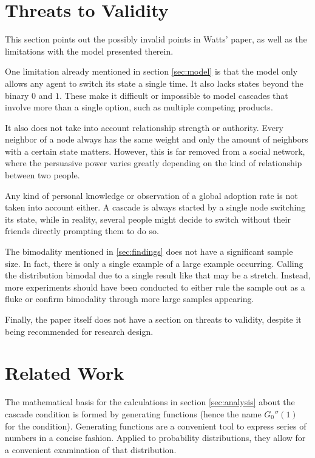 \documentclass{sig-alternate-05-2015}
\begin{document}
\section{Threats to Validity}\label{sec:threats}

This section points out the possibly invalid points in Watts' paper\cite{simplemodel}, as well as the limitations with the model presented therein.

One limitation already mentioned in section \ref{sec:model} is that the model only allows any agent to switch its state a single time. It also lacks states beyond the binary $0$ and $1$. These make it difficult or impossible to model cascades that involve more than a single option, such as multiple competing products.

It also does not take into account relationship strength or authority. Every neighbor of a node always has the same weight and only the amount of neighbors with a certain state matters. However, this is far removed from a social network, where the persuasive power varies greatly depending on the kind of relationship between two people.

Any kind of personal knowledge or observation of a global adoption rate is not taken into account either. A cascade is always started by a single node switching its state, while in reality, several people might decide to switch without their friends directly prompting them to do so.

The bimodality mentioned in \ref{sec:findings} does not have a significant sample size. In fact, there is only a single example of a large example occurring. Calling the distribution bimodal due to a single result like that may be a stretch. Instead, more experiments should have been conducted to either rule the sample out as a fluke or confirm bimodality through more large samples appearing.

Finally, the paper itself does not have a section on threats to validity, despite it being recommended for research design\cite{yodawg}.


\section{Related Work}\label{sec:related-work}

The mathematical basis for the calculations in section \ref{sec:analysis} about the cascade condition is formed by generating functions (hence the name $G_0''(1)$ for the condition). Generating functions are a convenient tool to express series of numbers in a concise fashion. Applied to probability distributions, they allow for a convenient examination of that distribution.
\end{document}
